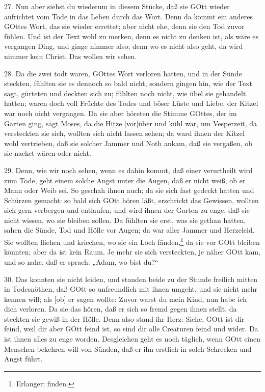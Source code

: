 27. Nun aber siehst du wiederum in diesem Stücke, daß sie GOtt wieder aufrichtet vom Tode in das Leben durch das Wort. Denn da kommt ein anderes GOttes Wort, das sie wieder errettet; aber nicht ehe, denn sie den Tod zuvor fühlen. Und ist der Text wohl zu merken, denn es nicht zu denken ist, als wäre es vergangen Ding, und ginge nimmer also; denn wo es nicht also geht, da wird nimmer kein Christ. Das wollen wir sehen.

28. Da die zwei todt waren, GOttes Wort verloren hatten, und in der Sünde steckten, fühlten sie es dennoch so bald nicht, sondern gingen hin, wie der Text sagt, gürteten und deckten sich zu; fühlten noch nicht, wie übel sie gehandelt hatten; waren doch voll Früchte des Todes und böser Lüste und Liebe, der Kitzel war noch nicht vergangen. Da sie aber höreten die Stimme GOttes, der im Garten ging, sagt Moses, da die Hitze [vor]über und kühl war, um Vesperzeit, da versteckten sie sich, wollten sich nicht lassen sehen; da ward ihnen der Kitzel wohl vertrieben, daß sie solcher Jammer und Noth ankam, daß sie vergaßen, ob sie nacket wären oder nicht.

29. Denn, wie wir noch sehen, wenn es dahin kommt, daß einer verurtheilt wird zum Tode, geht einem solche Angst unter die Augen, daß er nicht weiß, ob er Mann oder Weib sei. So geschah ihnen auch; da sie sich fast gedeckt hatten und Schürzen gemacht: so bald sich GOtt hören läßt, erschrickt das Gewissen, wollten sich gern verbergen und entlaufen, und wird ihnen der Garten zu enge, daß sie nicht wissen, wo sie bleiben sollen. Da fühlten sie erst, was sie gethan hatten, sahen die Sünde, Tod und Hölle vor Augen; da war aller Jammer und Herzeleid. Sie wollten fliehen und kriechen, wo sie ein Loch fänden,\footnote{Erlanger: finden.} da sie vor GOtt bleiben könnten; aber da ist kein Raum. Je mehr sie sich versteckten, je näher GOtt kam, und so nahe, daß er sprach: „Adam, wo bist du?“

30. Das konnten sie nicht leiden, und standen beide zu der Stunde freilich mitten in Todesnöthen, daß GOtt so unfreundlich mit ihnen umgeht, und sie nicht mehr kennen will; als [ob] er sagen wollte: Zuvor warst du mein Kind, nun habe ich dich verloren. Da sie das hören, daß er sich so fremd gegen ihnen stellt, da steckten sie gewiß in der Hölle. Denn also stand ihr Herz: Siehe, GOtt ist dir feind, weil dir aber GOtt feind ist, so sind dir alle Creaturen feind und wider. Da ist ihnen alles zu enge worden. Desgleichen geht es noch täglich, wenn GOtt einen Menschen bekehren will von Sünden, daß er ihn erstlich in solch Schrecken und Angst führt.

